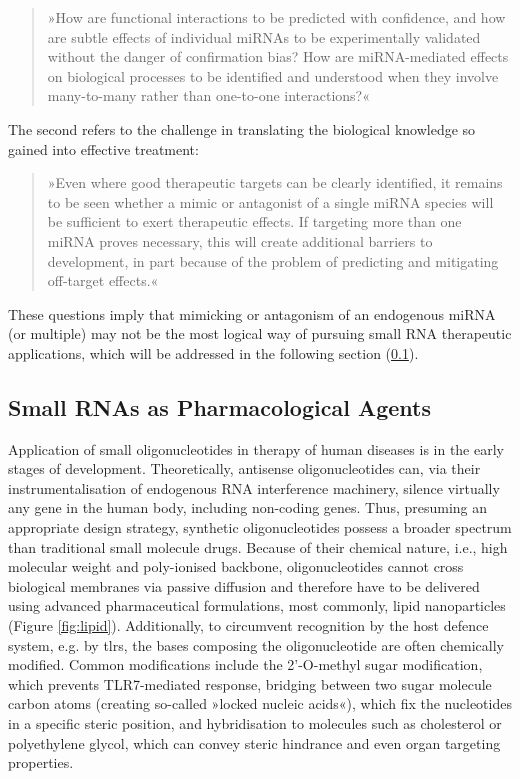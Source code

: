 \begin{quote}
»How are functional interactions to be predicted with confidence, and how are subtle effects of individual miRNAs to be experimentally validated without the danger of confirmation bias? How are miRNA-mediated effects on biological processes to be identified and understood when they involve many-to-many rather than one-to-one interactions?«
\end{quote}

The second refers to the challenge in translating the biological knowledge so gained into effective treatment:

\begin{quote}
»Even where good therapeutic targets can be clearly identified, it remains to be seen whether a mimic or antagonist of a single miRNA species will be sufficient to exert therapeutic effects. If targeting more than one miRNA proves necessary, this will create additional barriers to development, in part because of the problem of predicting and mitigating off-target effects.«
\end{quote}

These questions imply that mimicking or antagonism of an endogenous miRNA (or multiple) may not be the most logical way of pursuing small RNA therapeutic applications, which will be addressed in the following section (\ref{sec:discussion:smrna-therapy}).

\subsection{Small RNAs as Pharmacological Agents} \label{sec:discussion:smrna-therapy}
Application of small oligonucleotides in therapy of human diseases is in the early stages of development. Theoretically, antisense oligonucleotides can, via their instrumentalisation of endogenous RNA interference machinery, silence virtually any gene in the human body, including non-coding genes. Thus, presuming an appropriate design strategy, synthetic oligonucleotides possess a broader spectrum than traditional small molecule drugs. Because of their chemical nature, i.e., high molecular weight and poly-ionised backbone, oligonucleotides cannot cross biological membranes via passive diffusion and therefore have to be delivered using advanced pharmaceutical formulations, most commonly, lipid nanoparticles (Figure \ref{fig:lipid}).\cite{Akhtar2007, Whitehead2009} Additionally, to circumvent recognition by the host defence system, e.g. by \acp{tlr}, the bases composing the oligonucleotide are often chemically modified. Common modifications include the 2'-O-methyl sugar modification, which prevents TLR7-mediated response, bridging between two sugar molecule carbon atoms (creating so-called »locked nucleic acids«), which fix the nucleotides in a specific steric position, and hybridisation to molecules such as cholesterol or polyethylene glycol, which can convey steric hindrance and even organ targeting properties.\cite{Whitehead2009}

